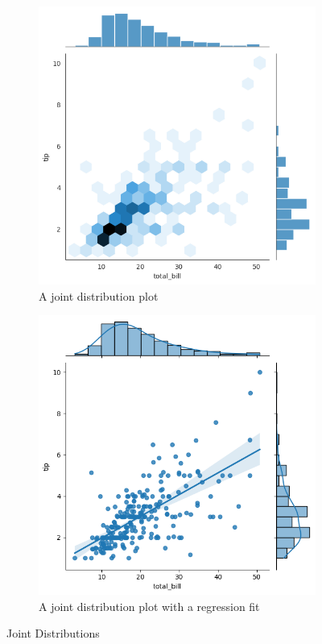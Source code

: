 \begin{figure}
    \centering
    \begin{subfigure}[b]{.45\textwidth}
        \includegraphics[width=\textwidth]{../img/A joint distribution plot.png}
        \caption{A joint distribution plot}
        \label{A joint distribution plot}
    \end{subfigure}
    \hfill
    \begin{subfigure}[b]{.45\textwidth}
        \includegraphics[width=\textwidth]{../img/A joint distribution plot with a regression fit.png}
        \caption{A joint distribution plot with a regression fit}
        \label{A joint distribution plot with a regression fit}
    \end{subfigure}
    \caption{Joint Distributions}
\end{figure}

